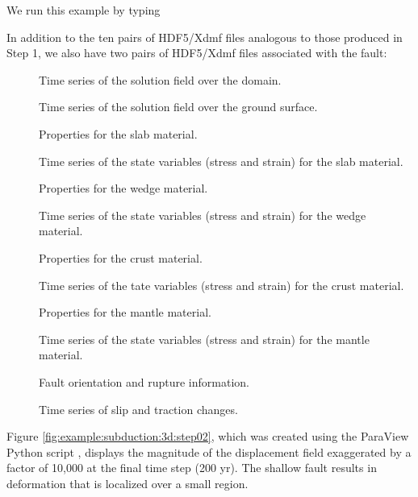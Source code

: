 We run this example by typing
In addition to the ten pairs of HDF5/Xdmf files analogous to those
produced in Step 1, we also have two pairs of HDF5/Xdmf files
associated with the fault:
\begin{description}
\item[] Time series of the solution field over the domain.
\item[] Time series of the solution field over the ground surface.
\item[] Properties for
  the slab material.
\item[] Time series of the state variables (stress and strain) for the slab material.
\item[] Properties for
  the wedge material.
\item[] Time series of the state variables (stress and strain) for the wedge material.
\item[] Properties for
  the crust material.
\item[] Time series of the tate variables
  (stress and strain) for the crust material.
\item[] Properties for
  the mantle material.
\item[] Time series of the state variables
  (stress and strain) for the mantle material.
\item[] Fault orientation
  and rupture information.
\item[] Time series of slip and
  traction changes.
\end{description}

Figure \ref{fig:example:subduction:3d:step02}, which was created
using the ParaView Python script ,
displays the magnitude of the displacement field exaggerated by a
factor of 10,000 at the final time step (200 yr).  The shallow
fault results in deformation that is localized over a small region.

